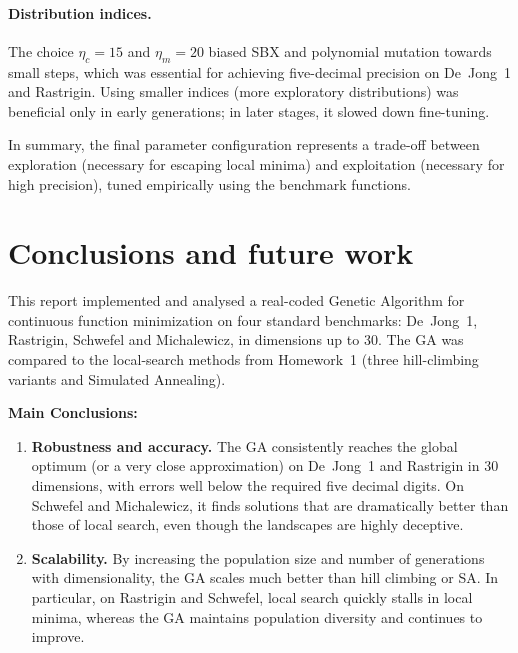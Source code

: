 \documentclass[a4paper,11pt]{article}
\begin{document}
\vspace{0.8em}

\paragraph{Distribution indices.}
The choice $\eta_c = 15$ and $\eta_m = 20$ biased SBX and polynomial mutation
towards small steps, which was essential for achieving five-decimal precision on
De~Jong~1 and Rastrigin. Using smaller indices (more exploratory distributions)
was beneficial only in early generations; in later stages, it slowed down
fine-tuning.

\vspace{1em}

\noindent In summary, the final parameter configuration represents a trade-off between
exploration (necessary for escaping local minima) and exploitation (necessary
for high precision), tuned empirically using the benchmark functions.

\clearpage

\section{Conclusions and future work}

\vspace{1em}

This report implemented and analysed a real-coded Genetic Algorithm for
continuous function minimization on four standard benchmarks:
De~Jong~1, Rastrigin, Schwefel and Michalewicz, in dimensions up to 30.
The GA was compared to the local-search methods from Homework~1
(three hill-climbing variants and Simulated Annealing).

\vspace{1em}

\noindent\textbf{Main Conclusions:}

\vspace{0.5em}
\begin{enumerate}
  \item \textbf{Robustness and accuracy.}
        The GA consistently reaches the global optimum (or a very close
        approximation) on De~Jong~1 and Rastrigin in 30 dimensions, with
        errors well below the required five decimal digits. On Schwefel and
        Michalewicz, it finds solutions that are dramatically better than those
        of local search, even though the landscapes are highly deceptive.
  \item \textbf{Scalability.}
        By increasing the population size and number of generations with
        dimensionality, the GA scales much better than hill climbing or SA.
        In particular, on Rastrigin and Schwefel, local search quickly stalls
        in local minima, whereas the GA maintains population diversity and
        continues to improve.
\end{enumerate}
\end{document}
